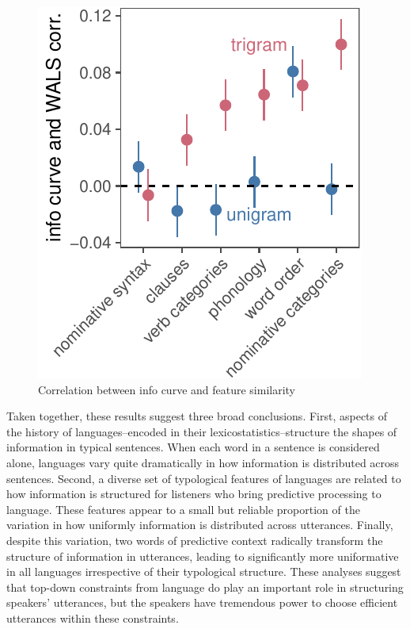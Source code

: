 \documentclass[10pt, letterpaper]{article}
\newenvironment{CodeChunk}{}{}
\begin{document}
\begin{CodeChunk}
\begin{figure}[tb]
\includegraphics{figs/type_cors-1} \caption[Correlation between info curve and feature similarity]{Correlation between info curve and feature similarity}\label{fig:type_cors}
\end{figure}
\end{CodeChunk}

Taken together, these results suggest three broad conclusions. First,
aspects of the history of languages--encoded in their
lexicostatistics--structure the shapes of information in typical
sentences. When each word in a sentence is considered alone, languages
vary quite dramatically in how information is distributed across
sentences. Second, a diverse set of typological features of languages
are related to how information is structured for listeners who bring
predictive processing to language. These features appear to a small but
reliable proportion of the variation in how uniformly information is
distributed across utterances. Finally, despite this variation, two
words of predictive context radically transform the structure of
information in utterances, leading to significantly more uniformative in
all languages irrespective of their typological structure. These
analyses suggest that top-down constraints from language do play an
important role in structuring speakers' utterances, but the speakers
have tremendous power to choose efficient utterances within these
constraints.
\end{document}
